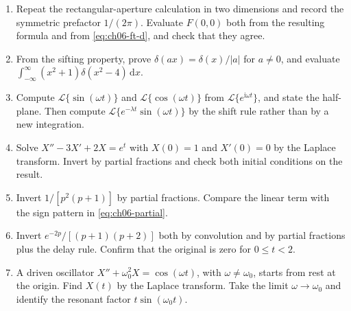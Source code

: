 \begin{enumerate}
    \item\label{ex:aperture} Repeat the rectangular-aperture calculation in two dimensions and record the symmetric prefactor $1/(2\pi)$. Evaluate $F(0,0)$ both from the resulting formula and from \eqref{eq:ch06-ft-d}, and check that they agree.

    \item\label{ex:delta-sifting} From the sifting property, prove $\delta(ax)=\delta(x)/|a|$ for $a\neq 0$, and evaluate $\int_{-\infty}^{\infty}(x^2+1)\delta(x^2-4)\,\mathrm{d}x$.

    \item\label{ex:laplace-elementary} Compute $\mathcal{L}\{\sin(\omega t)\}$ and $\mathcal{L}\{\cos(\omega t)\}$ from $\mathcal{L}\{e^{\mathrm{i}\omega t}\}$, and state the half-plane. Then compute $\mathcal{L}\{e^{-\lambda t}\sin(\omega t)\}$ by the shift rule rather than by a new integration.

    \item\label{ex:laplace-derivative} Solve $X''-3X'+2X=e^{t}$ with $X(0)=1$ and $X'(0)=0$ by the Laplace transform. Invert by partial fractions and check both initial conditions on the result.

    \item\label{ex:partial-fractions} Invert $1/[p^2(p+1)]$ by partial fractions. Compare the linear term with the sign pattern in \eqref{eq:ch06-partial}.

    \item\label{ex:delay-convolution} Invert $e^{-2p}/[(p+1)(p+2)]$ both by convolution and by partial fractions plus the delay rule. Confirm that the original is zero for $0\leq t<2$.

    \item\label{ex:oscillator-drive} A driven oscillator $X''+\omega_0^2 X=\cos(\omega t)$, with $\omega\neq\omega_0$, starts from rest at the origin. Find $X(t)$ by the Laplace transform. Take the limit $\omega\to\omega_0$ and identify the resonant factor $t\sin(\omega_0 t)$.
\end{enumerate}
